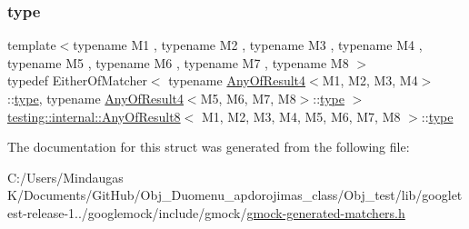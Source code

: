 \subsubsection{\texorpdfstring{type}{type}}
{\footnotesize\ttfamily template$<$typename M1 , typename M2 , typename M3 , typename M4 , typename M5 , typename M6 , typename M7 , typename M8 $>$ \\
typedef Either\+Of\+Matcher$<$ typename \mbox{\hyperlink{structtesting_1_1internal_1_1_any_of_result4}{Any\+Of\+Result4}}$<$M1, M2, M3, M4$>$\+::\mbox{\hyperlink{structtesting_1_1internal_1_1_any_of_result8_a8f8a1e78a019965c24bd22c78885747d}{type}}, typename \mbox{\hyperlink{structtesting_1_1internal_1_1_any_of_result4}{Any\+Of\+Result4}}$<$M5, M6, M7, M8$>$\+::\mbox{\hyperlink{structtesting_1_1internal_1_1_any_of_result8_a8f8a1e78a019965c24bd22c78885747d}{type}} $>$ \mbox{\hyperlink{structtesting_1_1internal_1_1_any_of_result8}{testing\+::internal\+::\+Any\+Of\+Result8}}$<$ M1, M2, M3, M4, M5, M6, M7, M8 $>$\+::\mbox{\hyperlink{structtesting_1_1internal_1_1_any_of_result8_a8f8a1e78a019965c24bd22c78885747d}{type}}}



The documentation for this struct was generated from the following file\+:\begin{DoxyCompactItemize}
\item 
C\+:/\+Users/\+Mindaugas K/\+Documents/\+Git\+Hub/\+Obj\+\_\+\+Duomenu\+\_\+apdorojimas\+\_\+class/\+Obj\+\_\+test/lib/googletest-\/release-\/1../googlemock/include/gmock/\mbox{\hyperlink{_obj__test_2lib_2googletest-release-1_88_81_2googlemock_2include_2gmock_2gmock-generated-matchers_8h}{gmock-\/generated-\/matchers.\+h}}\end{DoxyCompactItemize}
